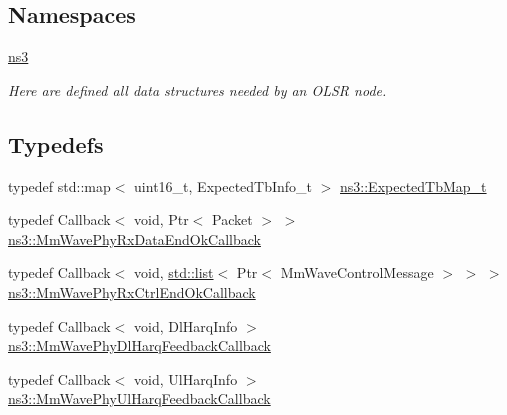 \subsection*{Namespaces}
\begin{DoxyCompactItemize}
\item 
 \hyperlink{namespacens3}{ns3}
\begin{DoxyCompactList}\small\item\em Here are defined all data structures needed by an O\+L\+SR node. \end{DoxyCompactList}\end{DoxyCompactItemize}
\subsection*{Typedefs}
\begin{DoxyCompactItemize}
\item 
typedef std\+::map$<$ uint16\+\_\+t, Expected\+Tb\+Info\+\_\+t $>$ \hyperlink{namespacens3_aa991639a7596b7ba936e9e7d3a8b4058}{ns3\+::\+Expected\+Tb\+Map\+\_\+t}
\item 
typedef Callback$<$ void, Ptr$<$ Packet $>$ $>$ \hyperlink{namespacens3_a3d4932dc40c714b73714c65a086bd622}{ns3\+::\+Mm\+Wave\+Phy\+Rx\+Data\+End\+Ok\+Callback}
\item 
typedef Callback$<$ void, \hyperlink{openflow-interface_8h_afd9bcfa176617760671b67580f536fa7}{std\+::list}$<$ Ptr$<$ Mm\+Wave\+Control\+Message $>$ $>$ $>$ \hyperlink{namespacens3_a147e86a90da3cd02d30b6a913cb786d6}{ns3\+::\+Mm\+Wave\+Phy\+Rx\+Ctrl\+End\+Ok\+Callback}
\item 
typedef Callback$<$ void, Dl\+Harq\+Info $>$ \hyperlink{namespacens3_af2838cfd552cb02b768db1c514cdbc80}{ns3\+::\+Mm\+Wave\+Phy\+Dl\+Harq\+Feedback\+Callback}
\item 
typedef Callback$<$ void, Ul\+Harq\+Info $>$ \hyperlink{namespacens3_ad991c5321b1aedfbb27717057c344ac9}{ns3\+::\+Mm\+Wave\+Phy\+Ul\+Harq\+Feedback\+Callback}
\end{DoxyCompactItemize}
